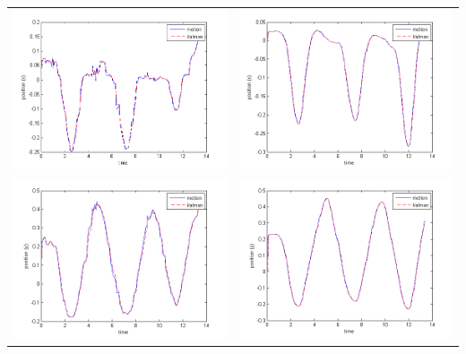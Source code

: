 \begin{center}
    \begin{tabular}{cc}
        \includegraphics[width=.5\textwidth, height = 0.23\textheight, keepaspectratio]{fig/filter0-x.png} & \includegraphics[width=.5\textwidth, height = 0.23\textheight, keepaspectratio]{fig/filter3-x.png}\\
        \includegraphics[width=.5\textwidth, height = 0.23\textheight, keepaspectratio]{fig/filter0-y.png} & \includegraphics[width=.5\textwidth, height = 0.23\textheight, keepaspectratio]{fig/filter3-y.png}\\

\end{tabular}
\end{center}

